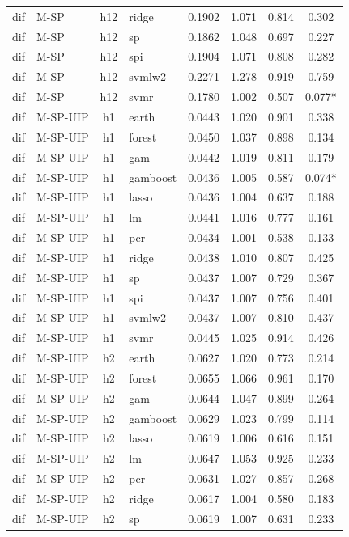 \begin{ThreePartTable}
\begin{longtable}[t]{llclcccc}
dif & M-SP & h12 & ridge & 0.1902 & 1.071 & 0.814 & 0.302\\
dif & M-SP & h12 & sp & 0.1862 & 1.048 & 0.697 & 0.227\\
dif & M-SP & h12 & spi & 0.1904 & 1.071 & 0.808 & 0.282\\
dif & M-SP & h12 & svmlw2 & 0.2271 & 1.278 & 0.919 & 0.759\\
dif & M-SP & h12 & svmr & 0.1780 & 1.002 & 0.507 & 0.077*\\
\addlinespace
dif & M-SP-UIP & h1 & earth & 0.0443 & 1.020 & 0.901 & 0.338\\
dif & M-SP-UIP & h1 & forest & 0.0450 & 1.037 & 0.898 & 0.134\\
dif & M-SP-UIP & h1 & gam & 0.0442 & 1.019 & 0.811 & 0.179\\
dif & M-SP-UIP & h1 & gamboost & 0.0436 & 1.005 & 0.587 & 0.074*\\
dif & M-SP-UIP & h1 & lasso & 0.0436 & 1.004 & 0.637 & 0.188\\
dif & M-SP-UIP & h1 & lm & 0.0441 & 1.016 & 0.777 & 0.161\\
dif & M-SP-UIP & h1 & pcr & 0.0434 & 1.001 & 0.538 & 0.133\\
dif & M-SP-UIP & h1 & ridge & 0.0438 & 1.010 & 0.807 & 0.425\\
dif & M-SP-UIP & h1 & sp & 0.0437 & 1.007 & 0.729 & 0.367\\
dif & M-SP-UIP & h1 & spi & 0.0437 & 1.007 & 0.756 & 0.401\\
dif & M-SP-UIP & h1 & svmlw2 & 0.0437 & 1.007 & 0.810 & 0.437\\
dif & M-SP-UIP & h1 & svmr & 0.0445 & 1.025 & 0.914 & 0.426\\
\addlinespace
dif & M-SP-UIP & h2 & earth & 0.0627 & 1.020 & 0.773 & 0.214\\
dif & M-SP-UIP & h2 & forest & 0.0655 & 1.066 & 0.961 & 0.170\\
dif & M-SP-UIP & h2 & gam & 0.0644 & 1.047 & 0.899 & 0.264\\
dif & M-SP-UIP & h2 & gamboost & 0.0629 & 1.023 & 0.799 & 0.114\\
dif & M-SP-UIP & h2 & lasso & 0.0619 & 1.006 & 0.616 & 0.151\\
dif & M-SP-UIP & h2 & lm & 0.0647 & 1.053 & 0.925 & 0.233\\
dif & M-SP-UIP & h2 & pcr & 0.0631 & 1.027 & 0.857 & 0.268\\
dif & M-SP-UIP & h2 & ridge & 0.0617 & 1.004 & 0.580 & 0.183\\
dif & M-SP-UIP & h2 & sp & 0.0619 & 1.007 & 0.631 & 0.233\\

\end{longtable}
\end{ThreePartTable}
